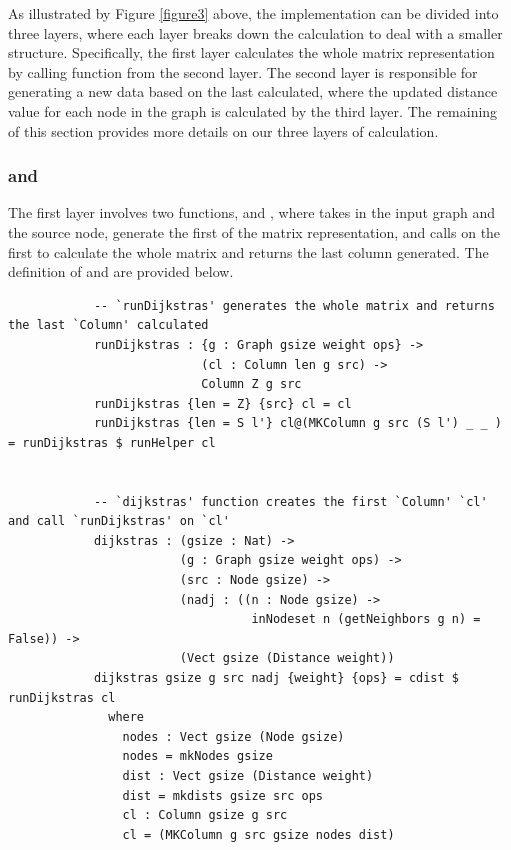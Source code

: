 As illustrated by Figure \ref{figure3} above, the implementation can be divided into three layers, where each layer breaks down the calculation to deal with a smaller structure. Specifically, the first layer calculates the whole matrix representation by calling function from the second layer. The second layer is responsible for generating a new  data based on the last  calculated, where the updated distance value for each node in the graph is calculated by the third layer. The remaining of this section provides more details on our three layers of calculation. 
\\

\subsubsection{ and } \label{first_layer}
The first layer involves two functions,  and , where  takes in the input graph and the source node, generate the first  of the matrix representation, and calls  on the first  to calculate the whole matrix and returns the last column generated. The definition of  and  are provided below.
\begin{lstlisting}
			-- `runDijkstras' generates the whole matrix and returns the last `Column' calculated
			runDijkstras : {g : Graph gsize weight ops} ->
			               (cl : Column len g src) ->
			               Column Z g src
			runDijkstras {len = Z} {src} cl = cl
			runDijkstras {len = S l'} cl@(MKColumn g src (S l') _ _ ) = runDijkstras $ runHelper cl


			-- `dijkstras' function creates the first `Column' `cl' and call `runDijkstras' on `cl'
			dijkstras : (gsize : Nat) ->
			            (g : Graph gsize weight ops) ->
			            (src : Node gsize) ->
			            (nadj : ((n : Node gsize) -> 
			            		  inNodeset n (getNeighbors g n) = False)) ->
			            (Vect gsize (Distance weight))
			dijkstras gsize g src nadj {weight} {ops} = cdist $ runDijkstras cl
			  where
			    nodes : Vect gsize (Node gsize)
			    nodes = mkNodes gsize
			    dist : Vect gsize (Distance weight)
			    dist = mkdists gsize src ops
			    cl : Column gsize g src
			    cl = (MKColumn g src gsize nodes dist)
\end{lstlisting}

